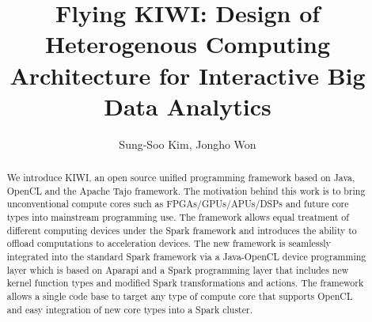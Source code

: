 \documentclass[runningheads,a4paper]{llncs}
\begin{document}

\mainmatter  %

\title{Flying KIWI: Design of Heterogenous Computing Architecture for Interactive Big Data Analytics}


%
%
\author{
Sung-Soo Kim, Jongho Won
}

%


%
%

\maketitle


\begin{abstract}
We introduce KIWI, an open source unified programming framework based on Java, OpenCL and the Apache Tajo framework. 
The motivation behind this work is to bring unconventional compute cores such as FPGAs/GPUs/APUs/DSPs and future core types into mainstream programming use. The framework allows equal treatment of different computing devices under the Spark framework and introduces the ability to offload computations to acceleration devices. The new framework is seamlessly integrated into the standard Spark framework via a Java-OpenCL device programming layer which is based on Aparapi and a Spark programming layer that includes new kernel function types and modified Spark transformations and actions. The framework allows a single code base to target any type of compute core that supports OpenCL and easy integration of new core types into a Spark cluster.

\end{abstract}
\end{document}
